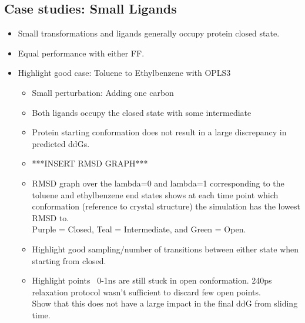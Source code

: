 \documentclass{article}
\begin{document}
\subsection{Case studies: Small Ligands}
   \begin{itemize}
   \item Small transformations and ligands generally occupy protein closed state.
   \item Equal performance with either FF.
   \item Highlight good case: Toluene to Ethylbenzene with OPLS3
      \begin{itemize}
      \item Small perturbation: Adding one carbon
      \item Both ligands occupy the closed state with some intermediate
      \item Protein starting conformation does not result in a large discrepancy in predicted ddGs.
      \item ***INSERT RMSD GRAPH***
      \item RMSD graph over the lambda=0 and lambda=1 corresponding to the toluene and ethylbenzene end states shows at each time point which conformation (reference to crystal structure) the simulation has the lowest RMSD to.
         \\ Purple = Closed, Teal = Intermediate, and Green = Open.
      \item Highlight good sampling/number of transitions between either state when starting from closed.
      \item Highlight points ~0-1ns are still stuck in open conformation. 240ps relaxation protocol wasn't sufficient to discard few open points.
         \\ Show that this does not have a large impact in the final ddG from sliding time.
      \end{itemize}
   

\end{itemize}
\end{document}
